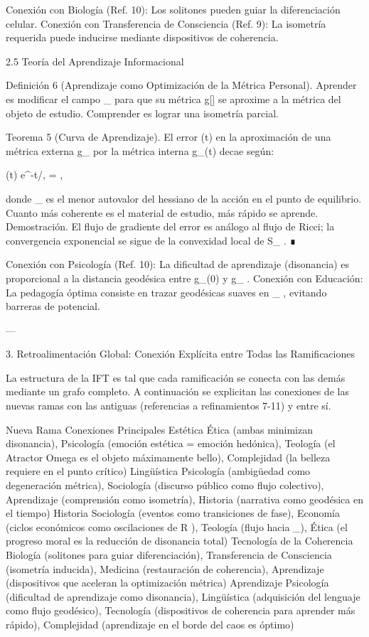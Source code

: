 \documentclass[12pt,twoside]{book}
\begin{document}
Conexión con Biología (Ref. 10): Los solitones pueden guiar la diferenciación celular.
Conexión con Transferencia de Consciencia (Ref. 9): La isometría requerida puede inducirse mediante dispositivos de coherencia.

2.5 Teoría del Aprendizaje Informacional

Definición 6 (Aprendizaje como Optimización de la Métrica Personal). Aprender es modificar el campo  \rho_{}  para que su métrica  g[\rho]  se aproxime a la métrica del objeto de estudio. Comprender es lograr una isometría parcial.

Teorema 5 (Curva de Aprendizaje). El error  \epsilon(t)  en la aproximación de una métrica externa  g_{}  por la métrica interna  g_{}(t)  decae según:

\epsilon(t) \propto e^{-t/\tau}, \quad \tau = ,

donde  \lambda_{\min}  es el menor autovalor del hessiano de la acción en el punto de equilibrio. Cuanto más coherente es el material de estudio, más rápido se aprende.
Demostración. El flujo de gradiente del error es análogo al flujo de Ricci; la convergencia exponencial se sigue de la convexidad local de  S_{} . ∎

Conexión con Psicología (Ref. 10): La dificultad de aprendizaje (disonancia) es proporcional a la distancia geodésica entre  g_{}(0)  y  g_{} .
Conexión con Educación: La pedagogía óptima consiste en trazar geodésicas suaves en  _{} , evitando barreras de potencial.

---

3. Retroalimentación Global: Conexión Explícita entre Todas las Ramificaciones

La estructura de la IFT es tal que cada ramificación se conecta con las demás mediante un grafo completo. A continuación se explicitan las conexiones de las nuevas ramas con las antiguas (referencias a refinamientos 7-11) y entre sí.

Nueva Rama Conexiones Principales
Estética Ética (ambas minimizan disonancia), Psicología (emoción estética = emoción hedónica), Teología (el Atractor Omega es el objeto máximamente bello), Complejidad (la belleza requiere    en el punto crítico)
Lingüística Psicología (ambigüedad como degeneración métrica), Sociología (discurso público como flujo colectivo), Aprendizaje (comprensión como isometría), Historia (narrativa como geodésica en el tiempo)
Historia Sociología (eventos como transiciones de fase), Economía (ciclos económicos como oscilaciones de  R ), Teología (flujo hacia  \Omega_\infty ), Ética (el progreso moral es la reducción de disonancia total)
Tecnología de la Coherencia Biología (solitones para guiar diferenciación), Transferencia de Consciencia (isometría inducida), Medicina (restauración de coherencia), Aprendizaje (dispositivos que aceleran la optimización métrica)
Aprendizaje Psicología (dificultad de aprendizaje como disonancia), Lingüística (adquisición del lenguaje como flujo geodésico), Tecnología (dispositivos de coherencia para aprender más rápido), Complejidad (aprendizaje en el borde del caos es óptimo)
\end{document}
